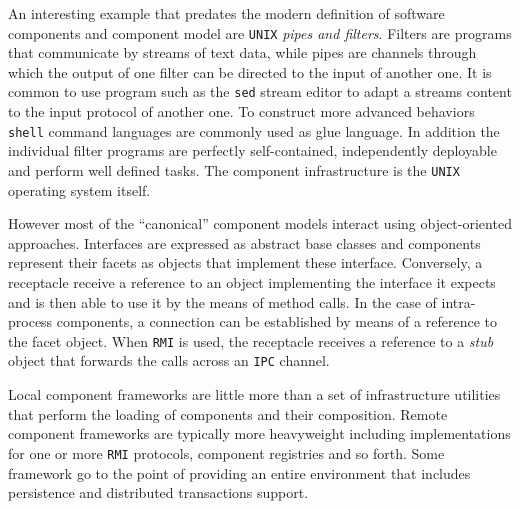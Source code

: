 An interesting example that predates the modern definition of software components and component model are \texttt{UNIX}
\emph{pipes and filters}. Filters are programs that communicate by streams of text data, while pipes are channels through
which the output of one filter can be directed to the input of another one. It is common to use program such as the \texttt{sed}
stream editor to adapt a streams content to the input protocol of another one. To construct more advanced behaviors \texttt{shell}
command languages are commonly used as glue language. In addition the individual filter programs are perfectly self-contained,
independently deployable and perform well defined tasks. The component infrastructure is the \texttt{UNIX} operating system itself.

However most of the ``canonical'' component models interact using object-oriented approaches. Interfaces are expressed as abstract
base classes and components represent their facets as objects that implement these interface. Conversely, a receptacle
receive a reference to an object implementing the interface it expects and is then able to use it by the means of method calls.
In the case of intra-process components, a connection can be established by means of a reference to the facet object.
When \texttt{RMI} is used, the receptacle receives a reference to a \emph{stub} object that forwards the calls across an \texttt{IPC} channel. 

Local component frameworks are little more than a set of infrastructure utilities that perform the loading of components and their composition.
Remote component frameworks are typically more heavyweight including implementations for one or more \texttt{RMI} protocols, component registries
and so forth. Some framework go to the point of providing an entire environment that includes persistence and distributed transactions support.

